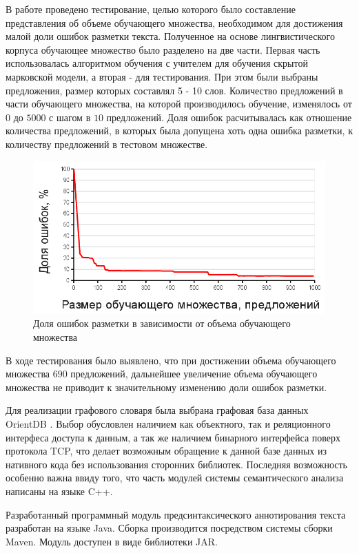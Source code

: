 В работе проведено тестирование, целью которого было составление представления об объеме обучающего множества, необходимом для достижения малой доли ошибок разметки текста. Полученное на основе лингвистического корпуса обучающее множество было разделено на две части. Первая часть использовалась алгоритмом обучения с учителем для обучения скрытой марковской модели, а вторая - для тестирования. При этом были выбраны предложения, размер которых составлял 5 - 10 слов. Количество предложений в части обучающего множества, на которой производилось обучение, изменялось от \(0\) до \(5000\) с шагом в \(10\) предложений. Доля ошибок расчитывалась как отношение количества предложений, в которых была допущена хоть одна ошибка разметки, к количеству предложений в тестовом множестве.
\begin{figure}[H]
	\centering
	\includegraphics[scale=0.5]{img/test_chart.png}
	\caption{Доля ошибок разметки в зависимости от объема обучающего множества}
\end{figure}
В ходе тестирования было выявлено, что при достижении объема обучающего множества \(690\) предложений, дальнейшее увеличение объема обучающего множества не приводит к значительному изменению доли ошибок разметки.

Для реализации графового словаря была выбрана графовая база данных OrientDB \cite{web.orient}. Выбор обусловлен наличием как объектного, так и реляционного интерфеса доступа к данным, а так же наличием бинарного интерфейса поверх протокола TCP, что делает возможным обращение к данной базе данных из нативного кода без использования сторонних библиотек. Последняя возможность особенно важна ввиду того, что часть модулей системы семантического анализа написаны на языке C++.

Разработанный программный модуль предсинтаксического аннотирования текста разработан на языке Java. Сборка производится посредством системы сборки Maven. Модуль доступен в виде библиотеки JAR.

